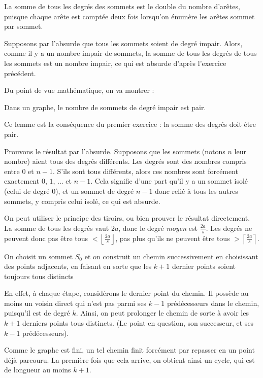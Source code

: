 \begin{Soln}{78}
La somme de tous les degrés des sommets est le double du nombre d'arêtes, puisque chaque arête est comptée deux fois lorsqu'on énumère les arêtes sommet par sommet.
\end{Soln}
\begin{Soln}{79}
Supposons par l'absurde que tous les sommets soient de degré impair. Alors, comme il y a un nombre impair de sommets, la somme de tous les degrés de tous les sommets est un nombre impair, ce qui est absurde d'après l'exercice précédent.
\end{Soln}
\begin{Soln}{80}
Du point de vue mathématique, on va montrer :
\begin{lemme}
Dans un graphe, le nombre de sommets de degré impair est pair.
\end{lemme}
Ce lemme est la conséquence du premier exercice : la somme des degrés doit être pair.
\end{Soln}
\begin{Soln}{81}
Prouvons le résultat par l'absurde. Supposons que les sommets (notons $n$ leur nombre) aient tous des degrés différents. Les degrés sont des nombres compris entre $0$ et $n-1$. S'ils sont tous différents, alors ces nombres sont forcément exactement $0$, $1$, ... et $n-1$. Cela signifie d'une part qu'il y a un sommet isolé (celui de degré $0$), et un sommet de degré $n-1$ donc relié à tous les autres sommets, y compris celui isolé, ce qui est absurde.
\end{Soln}
\begin{Soln}{82}
On peut utiliser le principe des tiroirs, ou bien prouver le résultat directement. La somme de tous les degrés vaut $2a$, donc le degré \emph{moyen} est $\frac{2a}{s}$. Les degrés ne peuvent donc pas être tous $<\left\lfloor \frac{2a}{s}\right\rfloor$, pas plus qu'ils ne peuvent être tous $>\left\lceil  \frac{2a}{s}\right\rceil$.
\end{Soln}
\begin{Soln}{83}
On choisit un sommet $S_0$ et on construit un chemin successivement en choisissant des points adjacents, en faisant en sorte que les $k+1$ dernier points soient toujours tous distincts

En effet, à chaque étape, considérons le dernier point du chemin. Il possède au moins un voisin direct qui n'est pas parmi ses $k-1$ prédécesseurs dans le chemin, puisqu'il est de degré $k$. Ainsi, on peut prolonger le chemin de sorte à avoir les $k+1$ derniers points tous distincts. (Le point en question, son successeur, et ses $k-1$ prédécesseurs).

Comme le graphe est fini, un tel chemin finit forcément par repasser en un point déjà parcouru. La première fois que cela arrive, on obtient ainsi un cycle, qui est de longueur au moins $k+1$.
\end{Soln}
